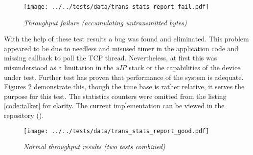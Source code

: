 \begin{figure}
\centering
\texttt{[image: ../../tests/data/trans\_stats\_report\_fail.pdf]}
\caption{\emph{Throughput failure (accumulating untransmitted bytes)}}\label{fig:fail}
\end{figure}


  With the help of these test results a bug was found and eliminated.
 This problem appeared to be due to needless and misused timer in the
 application code and missing callback to poll the TCP thread.
 Nevertheless, at first this was misunderstood as a limitation in the
 \emph{uIP} stack or the capabilities of the device under test. Further
 test has proven that performance of the system is adequate. Figures
 \ref{fig:good} demonstrate this, though the time base is rather relative,
 it serves the purpose for this test. The statistics counters were omitted
 from the listing \ref{code:talker} for clarity. The current implementation
 can be viewed in the repository
 ().

\begin{figure}
\centering
\texttt{[image: ../../tests/data/trans\_stats\_report\_good.pdf]}
\caption{\emph{Normal throughput results (two tests combined)}}\label{fig:good}
\end{figure}

